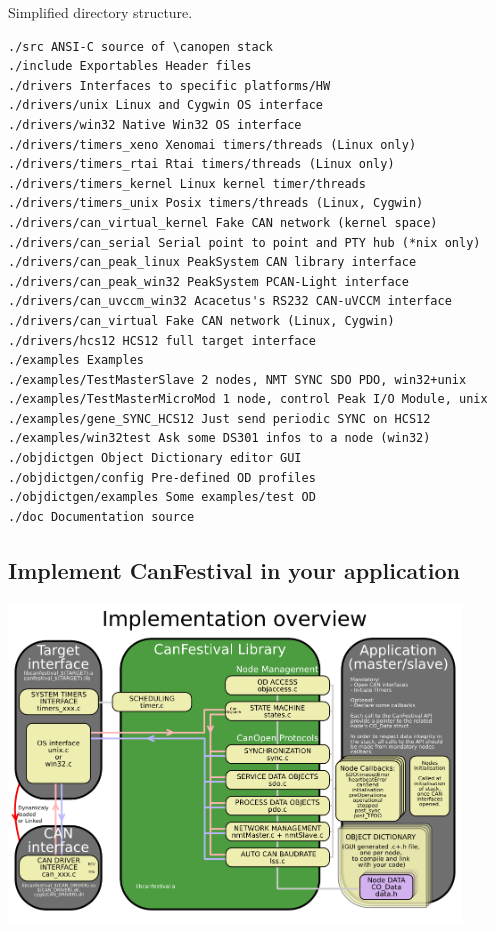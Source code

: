 \documentclass[12pt,english,a4paper]{book}
\newcommand{\canopen}{CANopen }
\begin{document}
Simplified directory structure.

\begin{verbatim}
./src ANSI-C source of \canopen stack
./include Exportables Header files
./drivers Interfaces to specific platforms/HW
./drivers/unix Linux and Cygwin OS interface
./drivers/win32 Native Win32 OS interface
./drivers/timers_xeno Xenomai timers/threads (Linux only)
./drivers/timers_rtai Rtai timers/threads (Linux only)
./drivers/timers_kernel Linux kernel timer/threads
./drivers/timers_unix Posix timers/threads (Linux, Cygwin)
./drivers/can_virtual_kernel Fake CAN network (kernel space)
./drivers/can_serial Serial point to point and PTY hub (*nix only)
./drivers/can_peak_linux PeakSystem CAN library interface
./drivers/can_peak_win32 PeakSystem PCAN-Light interface
./drivers/can_uvccm_win32 Acacetus's RS232 CAN-uVCCM interface
./drivers/can_virtual Fake CAN network (Linux, Cygwin)
./drivers/hcs12 HCS12 full target interface
./examples Examples
./examples/TestMasterSlave 2 nodes, NMT SYNC SDO PDO, win32+unix
./examples/TestMasterMicroMod 1 node, control Peak I/O Module, unix
./examples/gene_SYNC_HCS12 Just send periodic SYNC on HCS12
./examples/win32test Ask some DS301 infos to a node (win32)
./objdictgen Object Dictionary editor GUI
./objdictgen/config Pre-defined OD profiles
./objdictgen/examples Some examples/test OD
./doc Documentation source
\end{verbatim}



\subsection{Implement CanFestival in your application}

\begin{center}
\includegraphics[width=12cm]{Pictures/10000201000003F9000002CF880931E7} 
\par\end{center}
\end{document}
